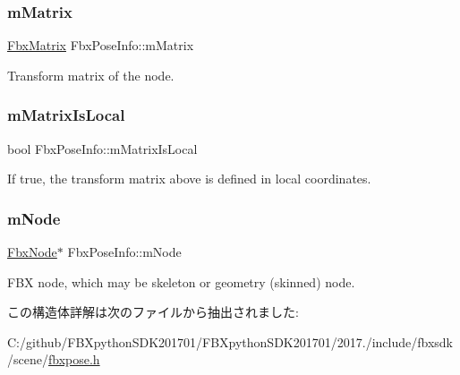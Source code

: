 \subsubsection{\texorpdfstring{m\+Matrix}{mMatrix}}
{\footnotesize\ttfamily \hyperlink{class_fbx_matrix}{Fbx\+Matrix} Fbx\+Pose\+Info\+::m\+Matrix}



Transform matrix of the node. 

\mbox{\label{struct_fbx_pose_info_a8da52035b7e08cafc70aa419111c7142}} 
\subsubsection{\texorpdfstring{m\+Matrix\+Is\+Local}{mMatrixIsLocal}}
{\footnotesize\ttfamily bool Fbx\+Pose\+Info\+::m\+Matrix\+Is\+Local}



If true, the transform matrix above is defined in local coordinates. 

\mbox{\label{struct_fbx_pose_info_a06e5aa4a4b65795d0a0bd87e4c79c74c}} 
\subsubsection{\texorpdfstring{m\+Node}{mNode}}
{\footnotesize\ttfamily \hyperlink{class_fbx_node}{Fbx\+Node}$\ast$ Fbx\+Pose\+Info\+::m\+Node}



F\+BX node, which may be skeleton or geometry (skinned) node. 



この構造体詳解は次のファイルから抽出されました\+:\begin{DoxyCompactItemize}
\item 
C\+:/github/\+F\+B\+Xpython\+S\+D\+K201701/\+F\+B\+Xpython\+S\+D\+K201701/2017./include/fbxsdk/scene/\hyperlink{fbxpose_8h}{fbxpose.\+h}\end{DoxyCompactItemize}
